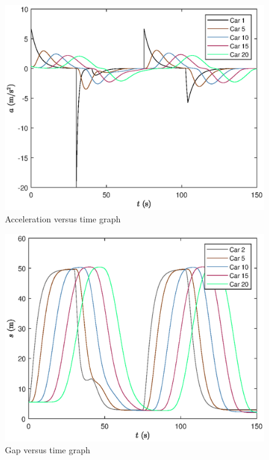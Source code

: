 \documentclass[12pt]{article}
\begin{document}
  \begin{figure}[H]\label{fig:homogeneousAcc}
  \includegraphics[width=13cm]{BottleNeck3.eps}
  \centering
  \caption{Acceleration versus time graph}
  \end{figure}

  \begin{figure}[H]\label{fig:homogeneousGap}
  \includegraphics[width=13cm]{BottleNeck4.eps}
  \centering
  \caption{Gap versus time graph}
  \end{figure}
\end{document}
